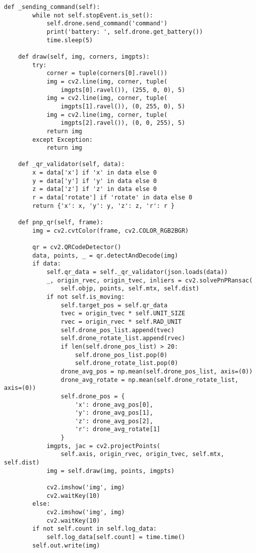 \begin{lstlisting}[caption=controller.py,label=controller]
    def _sending_command(self):
        while not self.stopEvent.is_set():
            self.drone.send_command('command')
            print('battery: ', self.drone.get_battery())
            time.sleep(5)

    def draw(self, img, corners, imgpts):
        try:
            corner = tuple(corners[0].ravel())
            img = cv2.line(img, corner, tuple(
                imgpts[0].ravel()), (255, 0, 0), 5)
            img = cv2.line(img, corner, tuple(
                imgpts[1].ravel()), (0, 255, 0), 5)
            img = cv2.line(img, corner, tuple(
                imgpts[2].ravel()), (0, 0, 255), 5)
            return img
        except Exception:
            return img

    def _qr_validator(self, data):
        x = data['x'] if 'x' in data else 0
        y = data['y'] if 'y' in data else 0
        z = data['z'] if 'z' in data else 0
        r = data['rotate'] if 'rotate' in data else 0
        return {'x': x, 'y': y, 'z': z, 'r': r }

    def pnp_qr(self, frame):
        img = cv2.cvtColor(frame, cv2.COLOR_RGB2BGR)

        qr = cv2.QRCodeDetector()
        data, points, _ = qr.detectAndDecode(img)
        if data:
            self.qr_data = self._qr_validator(json.loads(data))
            _, origin_rvec, origin_tvec, inliers = cv2.solvePnPRansac(
                self.objp, points, self.mtx, self.dist)
            if not self.is_moving:
                self.target_pos = self.qr_data
                tvec = origin_tvec * self.UNIT_SIZE
                rvec = origin_rvec * self.RAD_UNIT
                self.drone_pos_list.append(tvec)
                self.drone_rotate_list.append(rvec)
                if len(self.drone_pos_list) > 20:
                    self.drone_pos_list.pop(0)
                    self.drone_rotate_list.pop(0)
                drone_avg_pos = np.mean(self.drone_pos_list, axis=(0))
                drone_avg_rotate = np.mean(self.drone_rotate_list, axis=(0))
                self.drone_pos = {
                    'x': drone_avg_pos[0],
                    'y': drone_avg_pos[1],
                    'z': drone_avg_pos[2],
                    'r': drone_avg_rotate[1]
                }
            imgpts, jac = cv2.projectPoints(
                self.axis, origin_rvec, origin_tvec, self.mtx, self.dist)
            img = self.draw(img, points, imgpts)

            cv2.imshow('img', img)
            cv2.waitKey(10)
        else:
            cv2.imshow('img', img)
            cv2.waitKey(10)
        if not self.count in self.log_data:
            self.log_data[self.count] = time.time()
        self.out.write(img)


\end{lstlisting}
